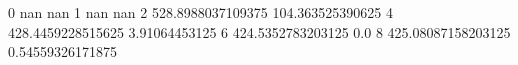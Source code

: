 0 nan nan
1 nan nan
2 528.8988037109375 104.363525390625
4 428.4459228515625 3.91064453125
6 424.5352783203125 0.0
8 425.08087158203125 0.54559326171875
